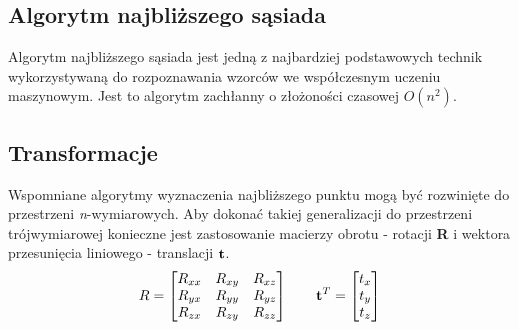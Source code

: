 \documentclass[12pt]{article}
\begin{document}
\begin{comment}
\textbf{Przypadek 2: punkt i zbiór punktów}
\\
Załóżmy, że A jest zbiorem n punktów oznaczonych jako $a_{i}$. Odległość między punktem p a zbiorem punktów A jest równa:
\[d(p, A) = \min_{i \in {1,...,n}} d(p, a_{i})\]
Wówczas najbliższy punkt spełnia warunek $d(p, a_{i}) = d(p, A)$
\\
\\
\textbf{Przypadek 3: punkt i odcinek}
\\
Załóżmy, że l jest odcinkiem łączącym punkty $p_{1}$ i $p_{2}$ Odległość między punktem p a odcinkiem l wynosi:
\[d(p, l) = \min_{u+v=1} ||up_{1}+vp_{2}-p|| \]
gdzie $u \in [0, 1]$ i $v \in [0, 1]$ 
\\
\\
\textbf{Przypadek 4: punkt i figura płaska}
\\
Załóżmy, że t jest trójkątem opisanym przez trzy punkty leżące na jego wierzchołkach: $p_{1} = (x_{1}, y_{1}, z_{1})$, $p_{2} = (x_{2}, y_{2}, z_{2})$ oraz $p_{3} = (x_{3}, y_{3}, z_{3})$ Odległość między punktem p a trójkątem t jest dana:
\[d(p, t) = \min_{u+v+w=1} ||up_{1}+vp_{2}-p+wp_{3}-p|| \]
gdzie $u \in [0, 1]$ i $v \in [0, 1]$ 
\end{comment}

\subsection{Algorytm najbliższego sąsiada}
Algorytm najbliższego sąsiada jest jedną z najbardziej podstawowych technik wykorzystywaną do rozpoznawania wzorców we współczesnym uczeniu maszynowym. Jest to algorytm zachłanny o złożoności czasowej $O(n^2)$.



\subsection{Transformacje}
Wspomniane algorytmy wyznaczenia najbliższego punktu mogą być rozwinięte do przestrzeni \emph{n}-wymiarowych. Aby dokonać takiej generalizacji do przestrzeni trójwymiarowej konieczne jest zastosowanie macierzy obrotu - rotacji \textbf{R} i wektora przesunięcia liniowego - translacji $\vb{t}$.
\[
R = \begin{bmatrix}
R_{xx} & R_{xy} & R_{xz} \\
R_{yx} & R_{yy} & R_{yz} \\
R_{zx} & R_{zy} & R_{zz}
\end{bmatrix}
\qquad
\vb{t}^T = \begin{bmatrix}
t_{x} \\ t_{y} \\ t_{z}
\end{bmatrix}
\]
\end{document}
